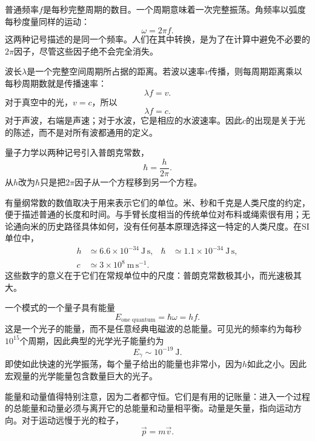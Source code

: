 普通频率\(f\)是每秒完整周期的数目。一个周期意味着一次完整振荡。角频率以弧度每秒度量同样的运动：
\begin{equation}
\omega=2\pi f.
\end{equation}
这两种记号描述的是同一个频率。人们在其中转换，是为了在计算中避免不必要的\(2\pi\)因子，尽管这些因子绝不会完全消失。

波长\(\lambda\)是一个完整空间周期所占据的距离。若波以速率\(v\)传播，则每周期距离乘以每秒周期数就是传播速率：
\begin{equation}
\lambda f=v.
\end{equation}
对于真空中的光，\(v=c\)，所以
\begin{equation}
\lambda f=c.
\end{equation}
对于声波，右端是声速；对于水波，它是相应的水波速率。因此\(c\)的出现是关于光的陈述，而不是对所有波都通用的定义。

量子力学以两种记号引入普朗克常数，
\begin{equation}
\hbar=\frac{h}{2\pi}.
\end{equation}
从\(h\)改为\(\hbar\)只是把\(2\pi\)因子从一个方程移到另一个方程。

有量纲常数的数值取决于用来表示它们的单位。米、秒和千克是人类尺度的约定，便于描述普通的长度和时间。与手臂长度相当的传统单位对布料或绳索很有用；无论通向米的历史路径具体如何，没有任何基本原理选择这一特定的人类尺度。在SI单位中，
\begin{equation}
\begin{aligned}
h &\simeq 6.6\times10^{-34}\ \mathrm{J\,s},
&\hbar &\simeq 1.1\times10^{-34}\ \mathrm{J\,s},\\
c &\simeq 3\times10^8\ \mathrm{m\,s^{-1}}.
\end{aligned}
\end{equation}
这些数字的意义在于它们在常规单位中的尺度：普朗克常数极其小，而光速极其大。

一个模式的一个量子具有能量
\begin{equation}
E_{\text{one quantum}}=\hbar\omega=hf.
\end{equation}
这是一个光子的能量，而不是任意经典电磁波的总能量。可见光的频率约为每秒\(10^{15}\)个周期，因此典型的光学光子能量约为
\begin{equation}
E_\gamma\sim 10^{-19}\ \mathrm{J}.
\end{equation}
即使如此快速的光学振荡，每个量子给出的能量也非常小，因为\(h\)如此之小。因此宏观量的光学能量包含数量巨大的光子。

能量和动量值得特别注意，因为二者都守恒。它们是有用的记账量：进入一个过程的总能量和动量必须与离开它的总能量和动量相平衡。动量是矢量，指向运动方向。对于运动远慢于光的粒子，
\begin{equation}
\vec p=m\vec v.
\end{equation}

